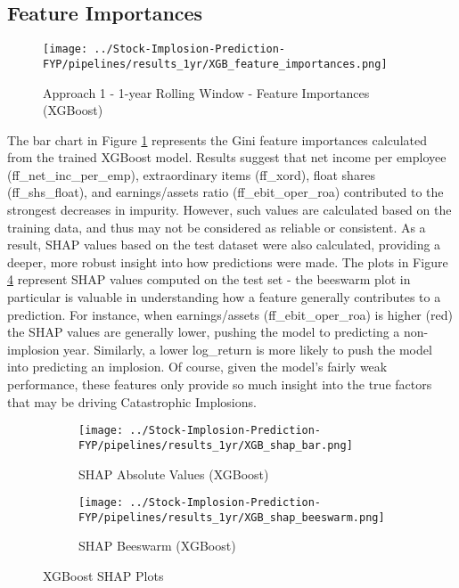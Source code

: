 \documentclass[a4paper]{report}
\begin{document}
\subsection{Feature Importances}
\begin{figure}[h] %
  \centering
  \texttt{[image: ../Stock-Implosion-Prediction-FYP/pipelines/results\_1yr/XGB\_feature\_importances.png]} %
  \caption{Approach 1 - 1-year Rolling Window - Feature Importances (XGBoost)}
  \label{fig:xgb_feat_if}
\end{figure}
The bar chart in Figure \ref{fig:xgb_feat_if} represents the Gini feature importances calculated from the trained XGBoost model. Results suggest that  net income per employee (ff\_net\_inc\_per\_emp), extraordinary items (ff\_xord),
float shares (ff\_shs\_float), and earnings/assets ratio (ff\_ebit\_oper\_roa) contributed to the strongest decreases in impurity. However, such values are calculated based on the training data, and thus may not be considered as reliable or consistent. As a result,
SHAP values based on the test dataset were also calculated, providing a deeper, more robust insight into how predictions were made. The plots 
in Figure \ref{fig:shap_comparison} represent SHAP values computed on the test set - the beeswarm plot in particular is valuable in understanding how 
a feature generally contributes to a prediction. For instance, when earnings/assets (ff\_ebit\_oper\_roa) is higher (red) the SHAP values are generally lower, pushing the model to predicting a non-implosion year. Similarly, a lower log\_return
is more likely to push the model into predicting an implosion. Of course, given the model's fairly weak performance, these features only provide so much insight into the true factors that may be driving Catastrophic Implosions.
\begin{figure}[H] %
  \centering
  \begin{subfigure}[b]{0.45\textwidth} %
    \centering
    \texttt{[image: ../Stock-Implosion-Prediction-FYP/pipelines/results\_1yr/XGB\_shap\_bar.png]} %
    \caption{SHAP Absolute Values (XGBoost)}
    \label{fig:xgb_shap_if}
  \end{subfigure}
  \hfill
  \begin{subfigure}[b]{0.45\textwidth} %
    \centering
    \texttt{[image: ../Stock-Implosion-Prediction-FYP/pipelines/results\_1yr/XGB\_shap\_beeswarm.png]} %
    \caption{SHAP Beeswarm (XGBoost)}
    \label{fig:xgb_shap_if_beeswarm}
  \end{subfigure}
  \caption{XGBoost SHAP Plots}
  \label{fig:shap_comparison}
\end{figure}
\end{document}
